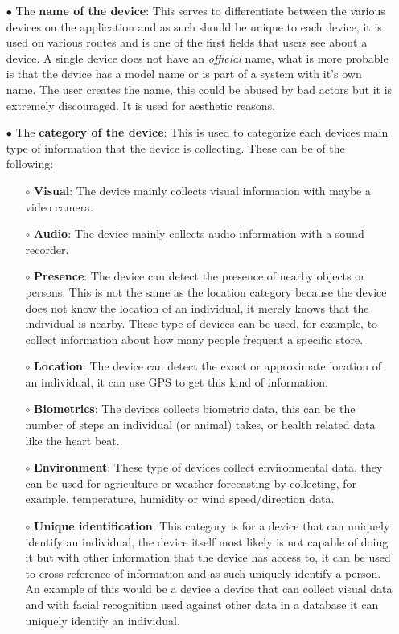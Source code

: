 \begin{itemize}
    \item[$\bullet$]
    The \textbf{name of the device}: This serves to differentiate between the various devices on the application and as such should be unique to each device, it is used on various routes and is one of the first fields that users see about a device. A single device does not have an \textit{official} name, what is more probable is that the device has a model name or is part of a system with it's own name. The user creates the name, this could be abused by bad actors but it is extremely discouraged. It is used for aesthetic reasons.
    \item[$\bullet$]
    The \textbf{category of the device}: This is used to categorize each devices main type of information that the device is collecting. These can be of the following:
    \begin{itemize}
        \item[$\circ$] \textbf{Visual}: The device mainly collects visual information with maybe a video camera.
        \item[$\circ$] \textbf{Audio}: The device mainly collects audio information with a sound recorder.
        \item[$\circ$] \textbf{Presence}: The device can detect the presence of nearby objects or persons. This is not the same as the location category because the device does not know the location of an individual, it merely knows that the individual is nearby. These type of devices can be used, for example, to collect information about how many people frequent a specific store.
        \item[$\circ$] \textbf{Location}: The device can detect the exact or approximate location of an individual, it can use GPS to get this kind of information.
        \item[$\circ$] \textbf{Biometrics}: The devices collects biometric data, this can be the number of steps an individual (or animal) takes, or health related data like the heart beat.
        \item[$\circ$] \textbf{Environment}: These type of devices collect environmental data, they can be used for agriculture or weather forecasting by collecting, for example, temperature, humidity or wind speed/direction data.
        \item[$\circ$] \textbf{Unique identification}: This category is for a device that can uniquely identify an individual, the device itself most likely is not capable of doing it but with other information that the device has access to, it can be used to cross reference of information and as such uniquely identify a person. An example of this would be a device a device that can collect visual data and with facial recognition used against other data in a database it can uniquely identify an individual.

\end{itemize}
\end{itemize}
